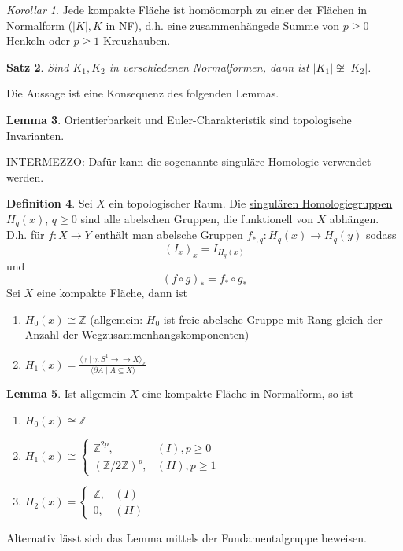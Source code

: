 \documentclass[a4paper, 12pt]{article}
\theoremstyle{plain}
\newtheorem{theorem}{Satz}[section] %
\theoremstyle{definition}
\newtheorem{definition}[theorem]{Definition} %
\theoremstyle{lemma}
\newtheorem{lemma}[theorem]{Lemma}
\theoremstyle{remark}
\theoremstyle{corollary}
\newtheorem{corollary}[theorem]{Korollar}
\theoremstyle{example}
\begin{document}
	\begin{corollary}
		Jede kompakte Fläche ist homöomorph zu einer der Flächen in Normalform ($\left|K\right|, K$ in NF), d.h. eine zusammenhängede Summe von $p \geq 0$ Henkeln oder $p \geq 1$ Kreuzhauben.
	\end{corollary}
	\begin{theorem}
		Sind $K_1,K_2$ in verschiedenen Normalformen, dann ist $\left|K_1\right| \not \cong \left|K_2\right|$.
	\end{theorem}
	Die Aussage ist eine Konsequenz des folgenden Lemmas.
	\begin{lemma}
		Orientierbarkeit und Euler-Charakteristik sind topologische Invarianten.
	\end{lemma}
	\underline{INTERMEZZO}: Dafür kann die sogenannte singuläre Homologie verwendet werden.
	\begin{definition}
		Sei $X$ ein topologischer Raum. Die \underline{singulären Homologiegruppen} $H_q(x)$, $q\geq 0$ sind alle abelschen Gruppen, die funktionell von $X$ abhängen. D.h. für $f:X\to Y$ enthält man abelsche Gruppen $f_{*, q}: H_q(x) \to H_q(y)$ sodass \[(I_x)_x = I_{H_q(x)}\] und \[(f\circ g)_* = f_* \circ g_*\]
		Sei $X$ eine kompakte Fläche, dann ist
		\begin{enumerate}
			\item $H_0(x) \cong \mathbb{Z}$ (allgemein: $H_0$ ist freie abelsche Gruppe mit Rang gleich der Anzahl der Wegzusammenhangskomponenten)
			\item $H_1(x) = \frac{\langle\gamma \mid \gamma: S^1 \to \to X\rangle_\mathbb{Z}}{\langle\partial A \mid A \subseteq X\rangle}$
		\end{enumerate}
	\end{definition}
	\begin{lemma}
		Ist allgemein $X$ eine kompakte Fläche in Normalform, so ist \begin{enumerate}
			\item $H_0(x) \cong \mathbb{Z}$
			\item $H_1(x) \cong \begin{cases}
				\mathbb{Z}^{2p}, & (I), p \geq 0\\
				\left(\mathbb{Z}/2\mathbb{Z}\right)^{p}, & (II), p \geq 1
				\end{cases}$
			\item $H_2(x) = \begin{cases}
				\mathbb{Z}, & (I)\\
				0, & (II)
				\end{cases}$
		\end{enumerate}
	\end{lemma}
	Alternativ lässt sich das Lemma mittels der Fundamentalgruppe beweisen.
\end{document}
